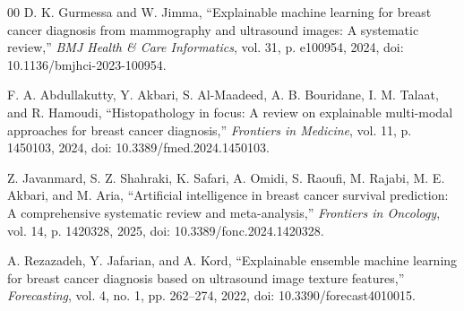 \documentclass[conference]{IEEEtran}
\begin{document}
\begin{thebibliography}{00}
 D. K. Gurmessa and W. Jimma, ``Explainable machine learning for breast cancer diagnosis from mammography and ultrasound images: A systematic review,'' \textit{BMJ Health \& Care Informatics}, vol. 31, p. e100954, 2024, doi: 10.1136/bmjhci-2023-100954.

 F. A. Abdullakutty, Y. Akbari, S. Al-Maadeed, A. B. Bouridane, I. M. Talaat, and R. Hamoudi, ``Histopathology in focus: A review on explainable multi-modal approaches for breast cancer diagnosis,'' \textit{Frontiers in Medicine}, vol. 11, p. 1450103, 2024, doi: 10.3389/fmed.2024.1450103.

 Z. Javanmard, S. Z. Shahraki, K. Safari, A. Omidi, S. Raoufi, M. Rajabi, M. E. Akbari, and M. Aria, ``Artificial intelligence in breast cancer survival prediction: A comprehensive systematic review and meta-analysis,'' \textit{Frontiers in Oncology}, vol. 14, p. 1420328, 2025, doi: 10.3389/fonc.2024.1420328.

 A. Rezazadeh, Y. Jafarian, and A. Kord, ``Explainable ensemble machine learning for breast cancer diagnosis based on ultrasound image texture features,'' \textit{Forecasting}, vol. 4, no. 1, pp. 262--274, 2022, doi: 10.3390/forecast4010015.

\end{thebibliography}
\end{document}
